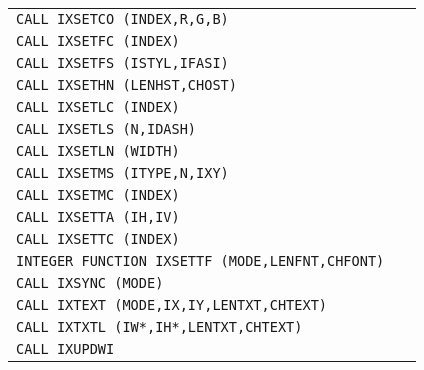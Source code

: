 \begin{longtable}{|>{\small\tt}p{.87\linewidth}r|}
CALL IXSETCO (INDEX,R,G,B)                            & \pageref{IXSETCO}     \\
CALL IXSETFC (INDEX)                                  & \pageref{IXSETFC}     \\
CALL IXSETFS (ISTYL,IFASI)                            & \pageref{IXSETFS}     \\
CALL IXSETHN (LENHST,CHOST)                           & \pageref{IXSETHN}     \\
CALL IXSETLC (INDEX)                                  & \pageref{IXSETLC}     \\
CALL IXSETLS (N,IDASH)                                & \pageref{IXSETLS}     \\
CALL IXSETLN (WIDTH)                                  & \pageref{IXSETLN}     \\
CALL IXSETMS (ITYPE,N,IXY)                            & \pageref{IXSETMS}     \\
CALL IXSETMC (INDEX)                                  & \pageref{IXSETMC}     \\
CALL IXSETTA (IH,IV)                                  & \pageref{IXSETTA}     \\
CALL IXSETTC (INDEX)                                  & \pageref{IXSETTC}     \\
INTEGER FUNCTION IXSETTF (MODE,LENFNT,CHFONT)         & \pageref{IXSETTF}     \\
CALL IXSYNC (MODE)                                    & \pageref{IXSYNC}      \\
CALL IXTEXT (MODE,IX,IY,LENTXT,CHTEXT)                & \pageref{IXTEXT}      \\
CALL IXTXTL (IW*,IH*,LENTXT,CHTEXT)                   & \pageref{IXTXTL}      \\
CALL IXUPDWI                                          & \pageref{IXUPDWI}     \\
\end{longtable}
